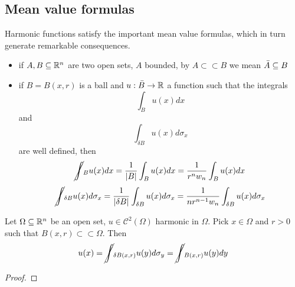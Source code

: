 \subsection{Mean value formulas}
Harmonic functions satisfy the important mean value formulas, which in turn generate remarkable consequences. 
\begin{remark}[Notations]
    \begin{itemize}
        \item if $A,B \subseteq \mathbb{R}^n$ are two open sets, $A$ bounded, by $A \subset \subset B$ we mean $\Bar{A} \subseteq B$
        \item if $B = B(x,r)$ is a ball and $u: \Bar{B} \rightarrow \mathbb{R}$ a function such that the integrals 
        \begin{equation*}
            \int_B u(x) dx 
        \end{equation*}
        and 
        \begin{equation*}
            \int_{\delta B} u(x) d\sigma_x 
        \end{equation*}
        are well defined, then
        \begin{equation*}
            \cancel{\int}_B u(x) dx = \frac{1}{|B|} \int_B u(x) dx = \frac{1}{r^n w_n} \int_B u(x) dx 
        \end{equation*}
        \begin{equation*}
            \cancel{\int}_{\delta B} u(x) d\sigma_x = \frac{1}{|\delta B|} \int_{\delta B} u(x) d\sigma_x = \frac{1}{nr^{n-1} w_n} \int_{\delta B} u(x) d\sigma_x 
        \end{equation*}
    \end{itemize}
\end{remark}
\begin{ThBox}
    \begin{Th}
        Let $\Omega \subseteq \mathbb{R}^n$ be an open set, $u \in \mathcal{C}^2(\Omega)$ harmonic in $\Omega$. Pick $x \in \Omega$ and $r > 0$ such that $B(x,r) \subset \subset \Omega$. Then
        \begin{equation*}
            u(x)= \cancel{\int}_{\delta B(x,r)} u(y) d\sigma_y = \cancel{\int}_{B(x,r)} u(y) dy
        \end{equation*}
    \end{Th}
\end{ThBox}
\begin{ProofBox}
    \begin{proof}
        
    \end{proof}
\end{ProofBox}
